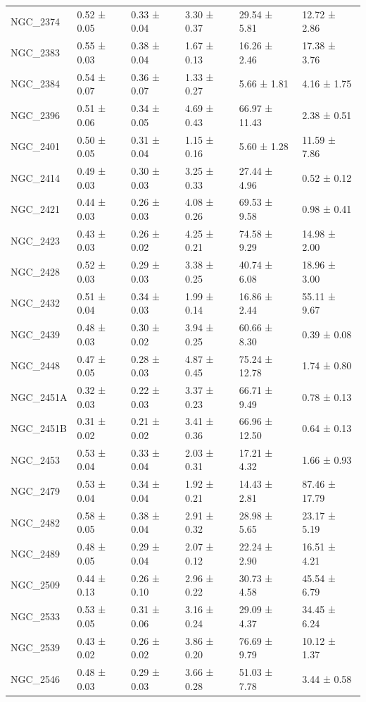 \begin{tabular}{llllll}
NGC_2374 & 0.52 ± 0.05 & 0.33 ± 0.04 & 3.30 ± 0.37 & 29.54 ± 5.81 & 12.72 ± 2.86 \\
NGC_2383 & 0.55 ± 0.03 & 0.38 ± 0.04 & 1.67 ± 0.13 & 16.26 ± 2.46 & 17.38 ± 3.76 \\
NGC_2384 & 0.54 ± 0.07 & 0.36 ± 0.07 & 1.33 ± 0.27 & 5.66 ± 1.81 & 4.16 ± 1.75 \\
NGC_2396 & 0.51 ± 0.06 & 0.34 ± 0.05 & 4.69 ± 0.43 & 66.97 ± 11.43 & 2.38 ± 0.51 \\
NGC_2401 & 0.50 ± 0.05 & 0.31 ± 0.04 & 1.15 ± 0.16 & 5.60 ± 1.28 & 11.59 ± 7.86 \\
NGC_2414 & 0.49 ± 0.03 & 0.30 ± 0.03 & 3.25 ± 0.33 & 27.44 ± 4.96 & 0.52 ± 0.12 \\
NGC_2421 & 0.44 ± 0.03 & 0.26 ± 0.03 & 4.08 ± 0.26 & 69.53 ± 9.58 & 0.98 ± 0.41 \\
NGC_2423 & 0.43 ± 0.03 & 0.26 ± 0.02 & 4.25 ± 0.21 & 74.58 ± 9.29 & 14.98 ± 2.00 \\
NGC_2428 & 0.52 ± 0.03 & 0.29 ± 0.03 & 3.38 ± 0.25 & 40.74 ± 6.08 & 18.96 ± 3.00 \\
NGC_2432 & 0.51 ± 0.04 & 0.34 ± 0.03 & 1.99 ± 0.14 & 16.86 ± 2.44 & 55.11 ± 9.67 \\
NGC_2439 & 0.48 ± 0.03 & 0.30 ± 0.02 & 3.94 ± 0.25 & 60.66 ± 8.30 & 0.39 ± 0.08 \\
NGC_2448 & 0.47 ± 0.05 & 0.28 ± 0.03 & 4.87 ± 0.45 & 75.24 ± 12.78 & 1.74 ± 0.80 \\
NGC_2451A & 0.32 ± 0.03 & 0.22 ± 0.03 & 3.37 ± 0.23 & 66.71 ± 9.49 & 0.78 ± 0.13 \\
NGC_2451B & 0.31 ± 0.02 & 0.21 ± 0.02 & 3.41 ± 0.36 & 66.96 ± 12.50 & 0.64 ± 0.13 \\
NGC_2453 & 0.53 ± 0.04 & 0.33 ± 0.04 & 2.03 ± 0.31 & 17.21 ± 4.32 & 1.66 ± 0.93 \\
NGC_2479 & 0.53 ± 0.04 & 0.34 ± 0.04 & 1.92 ± 0.21 & 14.43 ± 2.81 & 87.46 ± 17.79 \\
NGC_2482 & 0.58 ± 0.05 & 0.38 ± 0.04 & 2.91 ± 0.32 & 28.98 ± 5.65 & 23.17 ± 5.19 \\
NGC_2489 & 0.48 ± 0.05 & 0.29 ± 0.04 & 2.07 ± 0.12 & 22.24 ± 2.90 & 16.51 ± 4.21 \\
NGC_2509 & 0.44 ± 0.13 & 0.26 ± 0.10 & 2.96 ± 0.22 & 30.73 ± 4.58 & 45.54 ± 6.79 \\
NGC_2533 & 0.53 ± 0.05 & 0.31 ± 0.06 & 3.16 ± 0.24 & 29.09 ± 4.37 & 34.45 ± 6.24 \\
NGC_2539 & 0.43 ± 0.02 & 0.26 ± 0.02 & 3.86 ± 0.20 & 76.69 ± 9.79 & 10.12 ± 1.37 \\
NGC_2546 & 0.48 ± 0.03 & 0.29 ± 0.03 & 3.66 ± 0.28 & 51.03 ± 7.78 & 3.44 ± 0.58 \\

\end{tabular}

